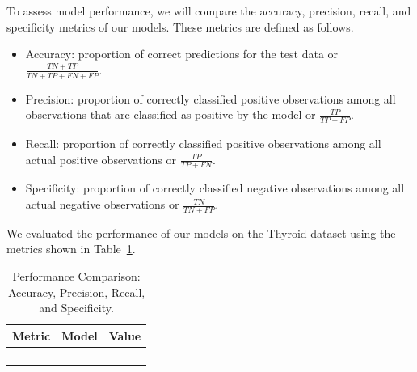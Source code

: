 \documentclass[
  letterpaper,
  DIV=11,
  numbers=noendperiod]{scrartcl}
\begin{document}
To assess model performance, we will compare the accuracy, precision,
recall, and specificity metrics of our models. These metrics are defined
as follows.

\begin{itemize}
\item
  Accuracy: proportion of correct predictions for the test data or
  \(\frac{TN + TP}{TN + TP + FN + FP}\).
\item
  Precision: proportion of correctly classified positive observations
  among all observations that are classified as positive by the model or
  \(\frac{TP}{TP + FP}\).
\item
  Recall: proportion of correctly classified positive observations among
  all actual positive observations or \(\frac{TP}{TP + FN}\).
\item
  Specificity: proportion of correctly classified negative observations
  among all actual negative observations or \(\frac{TN}{TN + FP}\).
\end{itemize}

We evaluated the performance of our models on the Thyroid dataset using
the metrics shown in Table~\ref{tbl-overall-performance-pdf}.

\begin{longtable}{>{\raggedright\arraybackslash}p{}>{\raggedright\arraybackslash}p{}>{\raggedleft\arraybackslash}p{}}

\caption{\label{tbl-overall-performance-pdf}Performance Comparison:
Accuracy, Precision, Recall, and Specificity.}

\tabularnewline

\toprule
Metric & Model & Value \\ 
\midrule\addlinespace[2.5pt]
\cellcolor[HTML]{FFFFFF}{Accuracy} & \cellcolor[HTML]{FFFFFF}{Random Forest} & \cellcolor[HTML]{FFFFFF}{94\%} \\ 
\cellcolor[HTML]{FFFFFF}{Precision} & \cellcolor[HTML]{FFFFFF}{ANN, Logistic Regression, Random Forest} & \cellcolor[HTML]{FFFFFF}{85\%} \\ 
\cellcolor[HTML]{FFFFFF}{Recall} & \cellcolor[HTML]{FFFFFF}{SVM} & \cellcolor[HTML]{FFFFFF}{100\%} \\ 
\cellcolor[HTML]{FFFFFF}{Specificity} & \cellcolor[HTML]{FFFFFF}{Random Forest} & \cellcolor[HTML]{FFFFFF}{94\%} \\ 
\bottomrule

\end{longtable}
\end{document}
